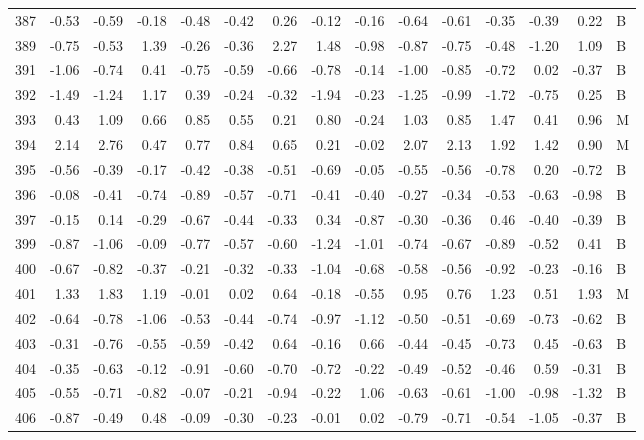 \begin{table}[ht]
\begin{tabular}{rrrrrrrrrrrrrrl}
  387 & -0.53 & -0.59 & -0.18 & -0.48 & -0.42 & 0.26 & -0.12 & -0.16 & -0.64 & -0.61 & -0.35 & -0.39 & 0.22 & B \\ 
  389 & -0.75 & -0.53 & 1.39 & -0.26 & -0.36 & 2.27 & 1.48 & -0.98 & -0.87 & -0.75 & -0.48 & -1.20 & 1.09 & B \\ 
  391 & -1.06 & -0.74 & 0.41 & -0.75 & -0.59 & -0.66 & -0.78 & -0.14 & -1.00 & -0.85 & -0.72 & 0.02 & -0.37 & B \\ 
  392 & -1.49 & -1.24 & 1.17 & 0.39 & -0.24 & -0.32 & -1.94 & -0.23 & -1.25 & -0.99 & -1.72 & -0.75 & 0.25 & B \\ 
  393 & 0.43 & 1.09 & 0.66 & 0.85 & 0.55 & 0.21 & 0.80 & -0.24 & 1.03 & 0.85 & 1.47 & 0.41 & 0.96 & M \\ 
  394 & 2.14 & 2.76 & 0.47 & 0.77 & 0.84 & 0.65 & 0.21 & -0.02 & 2.07 & 2.13 & 1.92 & 1.42 & 0.90 & M \\ 
  395 & -0.56 & -0.39 & -0.17 & -0.42 & -0.38 & -0.51 & -0.69 & -0.05 & -0.55 & -0.56 & -0.78 & 0.20 & -0.72 & B \\ 
  396 & -0.08 & -0.41 & -0.74 & -0.89 & -0.57 & -0.71 & -0.41 & -0.40 & -0.27 & -0.34 & -0.53 & -0.63 & -0.98 & B \\ 
  397 & -0.15 & 0.14 & -0.29 & -0.67 & -0.44 & -0.33 & 0.34 & -0.87 & -0.30 & -0.36 & 0.46 & -0.40 & -0.39 & B \\ 
  399 & -0.87 & -1.06 & -0.09 & -0.77 & -0.57 & -0.60 & -1.24 & -1.01 & -0.74 & -0.67 & -0.89 & -0.52 & 0.41 & B \\ 
  400 & -0.67 & -0.82 & -0.37 & -0.21 & -0.32 & -0.33 & -1.04 & -0.68 & -0.58 & -0.56 & -0.92 & -0.23 & -0.16 & B \\ 
  401 & 1.33 & 1.83 & 1.19 & -0.01 & 0.02 & 0.64 & -0.18 & -0.55 & 0.95 & 0.76 & 1.23 & 0.51 & 1.93 & M \\ 
  402 & -0.64 & -0.78 & -1.06 & -0.53 & -0.44 & -0.74 & -0.97 & -1.12 & -0.50 & -0.51 & -0.69 & -0.73 & -0.62 & B \\ 
  403 & -0.31 & -0.76 & -0.55 & -0.59 & -0.42 & 0.64 & -0.16 & 0.66 & -0.44 & -0.45 & -0.73 & 0.45 & -0.63 & B \\ 
  404 & -0.35 & -0.63 & -0.12 & -0.91 & -0.60 & -0.70 & -0.72 & -0.22 & -0.49 & -0.52 & -0.46 & 0.59 & -0.31 & B \\ 
  405 & -0.55 & -0.71 & -0.82 & -0.07 & -0.21 & -0.94 & -0.22 & 1.06 & -0.63 & -0.61 & -1.00 & -0.98 & -1.32 & B \\ 
  406 & -0.87 & -0.49 & 0.48 & -0.09 & -0.30 & -0.23 & -0.01 & 0.02 & -0.79 & -0.71 & -0.54 & -1.05 & -0.37 & B \\ 

\end{tabular}
\end{table}
